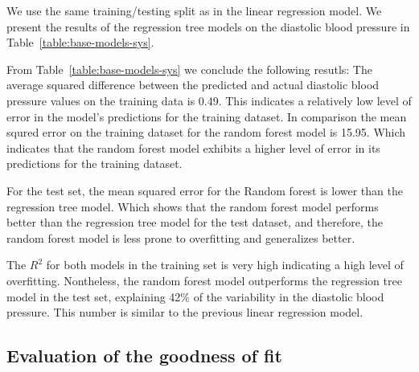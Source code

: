 \documentclass[12 pt]{scrartcl}
\numberwithin{equation}{section}
\begin{document}
We use the same training/testing split as in the linear regression model.
We present the results of the regression tree models on the diastolic blood pressure in Table~\ref{table:base-models-sys}.

\begin{table}[H]
    \centering
    \caption{Results of the base regression tree and random forest models for the systolic blood pressure.}
    \label{table:base-models-sys} 
\end{table}

From Table~\ref{table:base-models-sys} we conclude the following resutls:
The average squared difference between the predicted and actual diastolic blood pressure values on the training data is 0.49. 
This indicates a relatively low level of error in the model's predictions for the training dataset.
In comparison the mean squred error on the training dataset for the random forest model is 15.95.
Which indicates that the random forest model exhibits a higher level of error in its predictions for the training dataset.

For the test set, the mean squared error for the Random forest is lower than the regression tree model.
Which shows that the random forest model performs better than the regression tree model for the test dataset,
and therefore, the random forest model is less prone to overfitting and generalizes better.

The $R^2$ for both models in the training set is very high indicating a high level of overfitting.
Nontheless, the random forest model outperforms the regression tree model in the test set, 
explaining 42\% of the variability in the diastolic blood pressure. 
This number is similar to the previous linear regression model.


\subsection{Evaluation of the goodness of fit}
\label{subsec:Evaluation of the goodness of fit}
\end{document}
